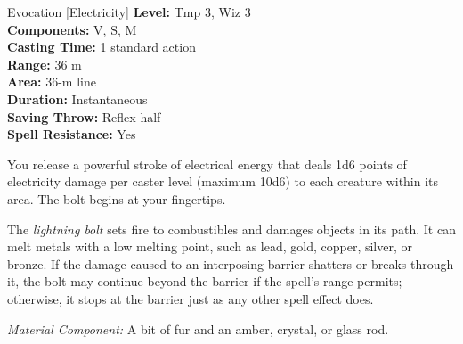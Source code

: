 {Evocation [Electricity]}
{
	\textbf{Level:}
	Tmp 3, Wiz 3\\
	\textbf{Components:}
	V, S, M\\
	\textbf{Casting Time:}
	1 standard action\\
	\textbf{Range:}
	36 m\\
	\textbf{Area:}
	36-m line\\
	\textbf{Duration:}
	Instantaneous\\
	\textbf{Saving Throw:}
	Reflex half\\
	\textbf{Spell Resistance:}
	Yes\\
}
{
	You release a powerful stroke of electrical energy that deals 1d6 points of electricity damage per caster level (maximum 10d6) to each creature within its area. The bolt begins at your fingertips.

	The \emph{lightning bolt} sets fire to combustibles and damages objects in its path. It can melt metals with a low melting point, such as lead, gold, copper, silver, or bronze. If the damage caused to an interposing barrier shatters or breaks through it, the bolt may continue beyond the barrier if the spell's range permits; otherwise, it stops at the barrier just as any other spell effect does.

	\textit{Material Component:}
	A bit of fur and an amber, crystal, or glass rod.

}

